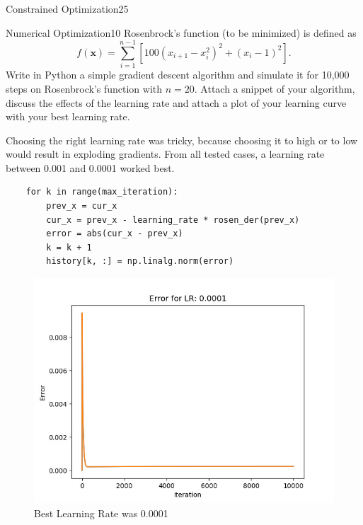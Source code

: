 \begin{questions}
\begin{question}{Constrained Optimization}{25}
\begin{answer}\end{answer}

\end{question}
	


\begin{question}{Numerical Optimization}{10}
Rosenbrock's function (to be minimized) is defined as 
$$f(\boldsymbol{x}) = \sum_{i=1}^{n-1} \left[ 100 (x_{i+1} - x_{i}^{2})^{2} + (x_{i} - 1)^{2}\right].$$
Write in Python a simple gradient descent algorithm and simulate it for 10,000 steps on Rosenbrock's function with $n=20$. Attach a snippet of your algorithm, discuss the effects of the learning rate and attach a plot of your learning curve with your best learning rate.

\begin{answer}
	Choosing the right learning rate was tricky, because choosing it to high or to low would result in exploding gradients. 
	From all tested cases, a learning rate between 0.001 and 0.0001 worked best. 
\end{answer}
\end{question}

\begin{lstlisting}
	for k in range(max_iteration):
	    prev_x = cur_x  
	    cur_x = prev_x - learning_rate * rosen_der(prev_x) 
	    error = abs(cur_x - prev_x)
	    k = k + 1 	
	    history[k, :] = np.linalg.norm(error)
\end{lstlisting}
\begin{figure}[h!]
	\includegraphics[width=12cm, scale=0.5]{00001.jpg}
	\caption{Best Learning Rate was 0.0001}
	\label{fig:LR_00001}
\end{figure}



\end{questions}
